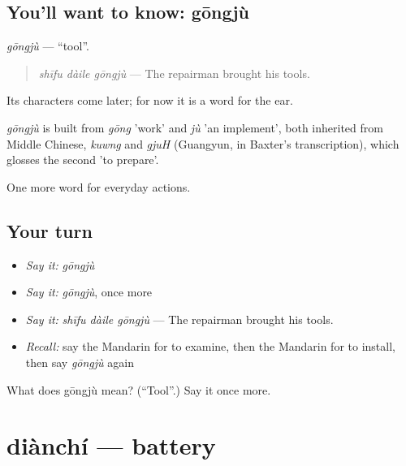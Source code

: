 \subsection*{You'll want to know: gōngjù}
\emph{gōngjù} — \textquotedblleft{}tool\textquotedblright{}.

\begin{quote}
\emph{shīfu dàile gōngjù} — The repairman brought his tools.
\end{quote}

Its characters come later; for now it is a word for the ear.

\begin{cousinweb}
\emph{gōngjù} is built from \emph{gōng} 'work' and \emph{jù} 'an implement', both inherited from Middle Chinese, \emph{kuwng} and \emph{gjuH} (Guangyun, in Baxter's transcription), which glosses the second 'to prepare'.
\end{cousinweb}

\begin{grammarlens}[title={What you've built}]
One more word for everyday actions.
\end{grammarlens}

\subsection*{Your turn}
\begin{itemize}
\raggedright
  \item \emph{Say it:} \emph{gōngjù}
  \item \emph{Say it:} \emph{gōngjù}, once more
  \item \emph{Say it:} \emph{shīfu dàile gōngjù} — The repairman brought his tools.
  \item \emph{Recall:} say the Mandarin for to examine, then the Mandarin for to install, then say \emph{gōngjù} again
\end{itemize}

\begin{tcolorbox}[breakable,colback=teal!4,colframe=teal!35!black,title={Before you move on}]
What does gōngjù mean? (\textquotedblleft{}Tool\textquotedblright{}.) Say it once more.
\end{tcolorbox}
\section[diànchí]{diànchí — battery}

\label{lesson:ZH-C208-dianchi}



